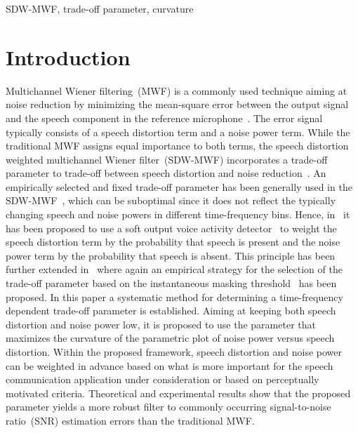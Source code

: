 \documentclass[10pt]{IEEEtran}
\begin{document}
\begin{keywords}
SDW-MWF, trade-off parameter, curvature
\end{keywords}

\section{Introduction}
Multichannel Wiener filtering~(MWF) is a commonly used technique aiming at noise reduction by minimizing the mean-square error between the output signal and the speech component in the reference microphone~\cite{Doclo_Chap_2010}.
The error signal typically consists of a speech distortion term and a noise power term. 
While the traditional MWF assigns equal importance to both terms, the speech distortion weighted multichannel Wiener filter~(SDW-MWF) incorporates a trade-off parameter to trade-off between speech distortion and noise reduction~\cite{Spriet_SP_2004,Doclo_SC_2007}. \newline
An empirically selected and fixed trade-off parameter has been generally used in the SDW-MWF~\cite{Doclo_SC_2007,Cornelis_thesis}, which can be suboptimal since it does not reflect the typically changing speech and noise powers in different time-frequency bins.
Hence, in~\cite{Ngo_IWAENC_2008,Ngo_ICASSP_2011,Ngo_EURASIP_2012} it has been proposed to use a soft output voice activity detector~\cite{Gazor_ITSAP_2003} to weight the speech distortion term by the probability that speech is present and the noise power term by the probability that speech is absent. 
This principle has been further extended in~\cite{Defraene_ICASSP_2012} where again an empirical strategy for the selection of the trade-off parameter based on the instantaneous masking threshold~\cite{Painter_IEEE_2000} has been proposed. \newline
In this paper a systematic method for determining a time-frequency dependent trade-off parameter is established.
Aiming at keeping both speech distortion and noise power low, it is proposed to use the parameter that maximizes the curvature of the parametric plot of noise power versus speech distortion.
Within the proposed framework, speech distortion and noise power can be weighted in advance based on what is more important for the speech communication application under consideration or based on perceptually motivated criteria.
Theoretical and experimental results show that the proposed parameter yields a more robust filter to commonly occurring signal-to-noise ratio~(SNR) estimation errors than the traditional MWF.
\end{document}
